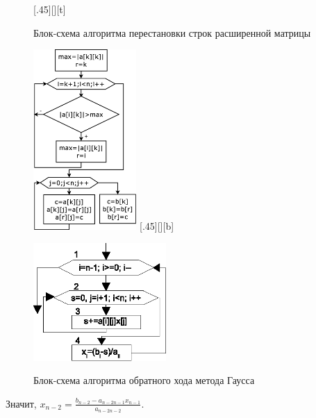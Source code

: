 \begin{figure}[h]
\begin{floatrow}
[.45\textwidth][\FBheight][t]
{\caption{Блок-схема алгоритма перестановки строк расширенной матрицы}
\label{ch06:refDrawing12}}
{\includegraphics[width=0.35\textwidth,keepaspectratio]{img/ris_6_13}}\hspace*{0.05\textwidth}
%
[.45\textwidth][\FBheight][b]
{\caption{Блок-схема алгоритма обратного хода метода Гаусса}
\label{ch06:refDrawing13}}
{\includegraphics[width=0.45\textwidth,keepaspectratio]{img/ris_6_14}}
\end{floatrow}
\end{figure}



Значит, $x_{n-2}=\frac{b_{n-2}-a_{n-2n-1}x_{n-1}}{a_{n-2n-2}}$.

